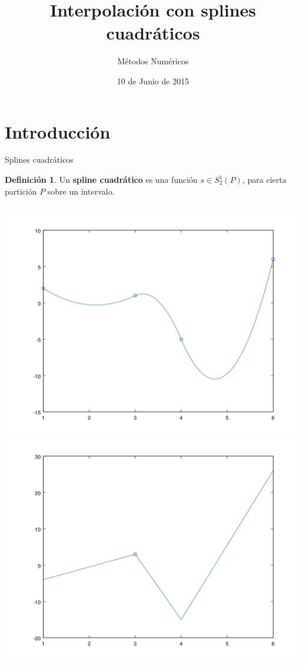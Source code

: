 \documentclass[compress]{beamer}
\title{Interpolación con splines cuadráticos} %
\subtitle{Métodos Numéricos}                  %
\author[Rubén M. \and Pablo B. \and Francisco M. \and Pablo M.\and Miguel A.]
{\texorpdfstring{
  \begin{columns}
    \column{.2\linewidth}
    \centering
    Rubén Morales \\
    \column{.2\linewidth}
    \centering
    Pablo Baeyens \\
    \column{.2\linewidth}
    \centering
    Francisco Morales \\
    \column{.2\linewidth}
    \centering
    Pablo Medina \\
    \column{.2\linewidth}
    \centering
    Miguel Anguita \\
  \end{columns}
}{
Rubén Morales \and Pablo Baeyens \and Francisco Morales
\and Pablo Medina \and Miguel Anguita
}}
\date{10 de Junio de 2015} %
\theoremstyle{definition}
\newtheorem*{definicion}{Definición}
\theoremstyle{remark}
\begin{document}
\begin{frame}
\titlepage
\end{frame}

\section{Introducción}

\begin{frame}{Splines cuadráticos}
\begin{definicion}
Un \textbf{spline cuadrático} es una función $s \in S_2^1(P)$, para
cierta partición $P$ sobre un intervalo.
\end{definicion}
\begin{columns}
\includegraphics[width=\textwidth]{EjemploDef.png}
\includegraphics[width=\textwidth]{EjemploDefDer.png}
\end{columns}
\end{frame}
\end{document}
